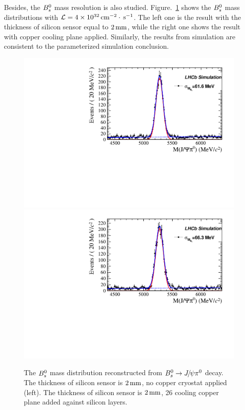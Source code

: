 Besides,
the ${{B}^0_{s}}$ mass resolution is also studied.
Figure.~\ref{fig:Bs_Jpsipi0} shows the ${{B}^0_{s}}$ mass distributions with $\mathcal{L}=4\times10^{32}\text{\,cm}^{-2}\cdot\text{\,s}^{-1}$.
The left one is the result with the thickness of silicon sensor equal to $2\text{\,mm}$,
while the right one shows the result with copper cooling plane applied.
Similarly,
the results from \geant simulation are consistent to the parameterized simulation conclusion.
\begin{figure}[hb]
  \begin{center}
    \includegraphics[width=0.49\linewidth]{Figures/06_ECAL/Bs_JpsiPi0/Bs_JpsiPiz/low_lumi/0_2/Bs_JpsiPi0.pdf}
    \includegraphics[width=0.49\linewidth]{Figures/06_ECAL/Bs_JpsiPi0/Bs_JpsiPiz/low_lumi/Cu_0_2/Bs_JpsiPi0.pdf}
    \vspace*{-0.5cm}
  \end{center}
  \caption{
      The ${{B}^0_{s}}$ mass distribution reconstructed from ${{B}^0_{s}}\rightarrow{\ensuremath{{J\mskip -3mu/\mskip -2mu\psi}}}{\ensuremath{{\pi}^0}}$ decay. 
      The thickness of silicon sensor is $2\text{\,mm}$, no copper cryostat applied (left). 
      The thickness of silicon sensor is $2\text{\,mm}$, 26 cooling copper plane added against silicon layers.
  }
  \label{fig:Bs_Jpsipi0}
\end{figure}


